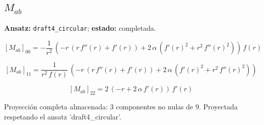 \documentclass[11pt]{article}
\begin{document}
\subsection*{$ M_{ab} $}
\textbf{Ansatz:} \texttt{draft4\_circular}; \textbf{estado:} completada.\par
\begin{dmath*}[breakdepth={5}]
\left[M_{ab}\right]_{00} = -\frac{1}{{r}^{2}}\,\left(-r\,\left(r\,f''\!\left(r\right) + f'\!\left(r\right)\right) + 2\,\alpha\,\left({f'\!\left(r\right)}^{2} + {r}^{2}\,{f''\!\left(r\right)}^{2}\right)\right)\,f\!\left(r\right)
\end{dmath*}
\par\smallskip
\begin{dmath*}[breakdepth={5}]
\left[M_{ab}\right]_{11} = \frac{1}{{r}^{2}\,f\!\left(r\right)}\,\left(-r\,\left(r\,f''\!\left(r\right) + f'\!\left(r\right)\right) + 2\,\alpha\,\left({f'\!\left(r\right)}^{2} + {r}^{2}\,{f''\!\left(r\right)}^{2}\right)\right)
\end{dmath*}
\par\smallskip
\begin{dmath*}[breakdepth={5}]
\left[M_{ab}\right]_{22} = 2\,\left(-r + 2\,\alpha\,f'\!\left(r\right)\right)\,f'\!\left(r\right)
\end{dmath*}
\par\smallskip
Proyección completa almacenada: 3 componentes no nulas de 9. Proyectada respetando el ansatz 'draft4\_circular'.\par\medskip
{}
\end{document}
